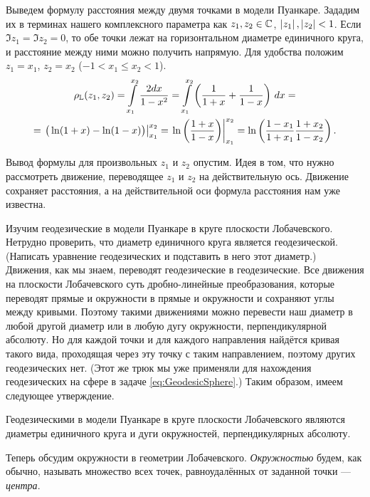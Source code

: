 Выведем формулу расстояния между двумя точками в модели Пуанкаре. Зададим их в терминах нашего комплексного параметра как $z_1, z_2 \in \mathbb{C}$, $\left\lvert z_1\right\rvert, \left\lvert z_2\right\rvert < 1$. Если $\Im z_1 = \Im z_2 = 0$, то обе точки лежат на горизонтальном диаметре единичного круга, и расстояние между ними можно получить напрямую. Для удобства положим $z_1 = x_1$, $z_2 = x_2$ ($-1 < x_1 \leqslant x_2 < 1$).
\begin{multline*}
	\rho_{\mathbb{L}}(z_1, z_2) = \int\limits_{x_1}^{x_2}\frac{2dx}{1 - x^2} = \int\limits_{x_1}^{x_2}\left(\frac{1}{1 + x} + \frac{1}{1 - x}\right)\,dx =\\ = \left.\big(\ln(1 + x) - \ln(1 - x)\big)\right|_{x_1}^{x_2} = \left.\ln\left(\frac{1 + x}{1 - x}\right)\right|_{x_1}^{x_2} = \ln\left(\frac{1 - x_1}{1 + x_1}\frac{1 + x_2}{1 - x_2}\right).
\end{multline*}

Вывод формулы для произвольных $z_1$ и $z_2$ опустим. Идея в том, что нужно рассмотреть движение, переводящее $z_1$ и $z_2$ на действительную ось. Движение сохраняет расстояния, а на действительной оси формула расстояния нам уже известна.

Изучим геодезические в модели Пуанкаре в круге плоскости Лобачевского. Нетрудно проверить, что диаметр единичного круга является геодезической. (Написать уравнение геодезических и подставить в него этот диаметр.) Движения, как мы знаем, переводят геодезические в геодезические. Все движения на плоскости Лобачевского суть дробно-линейные преобразования, которые переводят прямые и окружности в прямые и окружности и сохраняют углы между кривыми. Поэтому такими движениями можно перевести наш диаметр в любой другой диаметр или в любую дугу окружности, перпендикулярной абсолюту. Но для каждой точки и для каждого направления найдётся кривая такого вида, проходящая через эту точку с таким направлением, поэтому других геодезических нет. (Этот же трюк мы уже применяли для нахождения геодезических на сфере в задаче \ref{eq:GeodesicSphere}.) Таким образом, имеем следующее утверждение.

\begin{proposition}
	Геодезическими в модели Пуанкаре в круге плоскости Лобачевского являются диаметры единичного круга и дуги окружностей, перпендикулярных абсолюту.
\end{proposition}

Теперь обсудим окружности в геометрии Лобачевского. \textit{Окружностью} будем, как обычно, называть множество всех точек, равноудалённых от заданной точки --- \textit{центра}.

